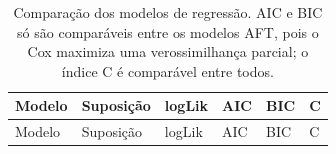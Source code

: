 \documentclass[
  brazilian,
]{article}
\begin{document}
\begin{longtable}[]{@{}
  >{\raggedright\arraybackslash}p{}
  >{\raggedright\arraybackslash}p{}
  >{\raggedleft\arraybackslash}p{}
  >{\raggedleft\arraybackslash}p{}
  >{\raggedleft\arraybackslash}p{}
  >{\raggedleft\arraybackslash}p{}@{}}
\caption{Comparação dos modelos de regressão. AIC e BIC só são
comparáveis entre os modelos AFT, pois o Cox maximiza uma
verossimilhança parcial; o índice C é comparável entre
todos.}\tabularnewline
\toprule\noalign{}
\begin{minipage}[b]{\linewidth}\raggedright
Modelo
\end{minipage} & \begin{minipage}[b]{\linewidth}\raggedright
Suposição
\end{minipage} & \begin{minipage}[b]{\linewidth}\raggedleft
logLik
\end{minipage} & \begin{minipage}[b]{\linewidth}\raggedleft
AIC
\end{minipage} & \begin{minipage}[b]{\linewidth}\raggedleft
BIC
\end{minipage} & \begin{minipage}[b]{\linewidth}\raggedleft
C
\end{minipage} \\
\midrule\noalign{}
\endfirsthead
\toprule\noalign{}
\begin{minipage}[b]{\linewidth}\raggedright
Modelo
\end{minipage} & \begin{minipage}[b]{\linewidth}\raggedright
Suposição
\end{minipage} & \begin{minipage}[b]{\linewidth}\raggedleft
logLik
\end{minipage} & \begin{minipage}[b]{\linewidth}\raggedleft
AIC
\end{minipage} & \begin{minipage}[b]{\linewidth}\raggedleft
BIC
\end{minipage} & \begin{minipage}[b]{\linewidth}\raggedleft
C
\end{minipage} \\

\end{longtable}
\end{document}
